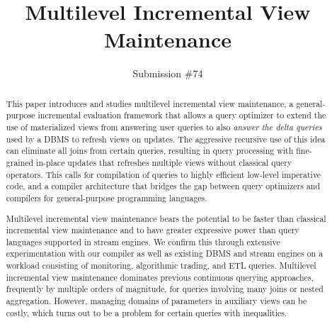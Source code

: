 \documentclass{sig-alternate}
\title{Multilevel Incremental View Maintenance}
\author{
Submission \#74
}
\newcommand{\comment}[1]{}
\begin{document}
\maketitle


\begin{abstract}
This paper introduces and studies multilevel incremental view maintenance,
a general-purpose incremental
evaluation framework that allows a query optimizer to extend the use of
materialized views from answering user queries to also \textit{answer the delta
queries} used by a DBMS to refresh views on updates.
The aggressive recursive use of this idea can eliminate all joins from certain
queries, resulting in query processing with fine-grained in-place updates that
refreshes multiple views without classical query operators. This calls for
compilation of queries to highly efficient low-level imperative code, and a
compiler architecture that bridges the gap between query optimizers and
compilers for general-purpose programming languages.


\comment{
Multilevel incremental view maintenance generalizes the idea of using
materialized views for query answering by allowing a query optimizer to use
materialized views for also answering delta queries, which are the auxiliary
queries that are used in incremental view maintenance to refresh materialized
views when updates happen. Aggressive recursive use of this idea allows to
eliminate all joins from certain queries and to generate highly efficient
low-level code without classical query operators that performs all query
evaluation and view refreshment work. This calls for the compilation of queries.

In this paper, we present a general compiler architecture for languages such as
SQL. To realize such a compiler, we overcome the challenges of materializing
views with binding patterns (parameters) to support arbitrarily nested queries
with aggregates, complex patterns of side effects that may arise, and the need
to perform sophisticated forms of deforestation and fusion frequently employed
in compilers but almost unknown in the database literature.
}

Multilevel incremental view maintenance bears the potential to be
faster than classical incremental view
maintenance and to have greater expressive power than query
languages supported in stream engines.
%
We confirm this through extensive experimentation with
our compiler as well as existing DBMS and stream engines
on a workload consisting of monitoring, algorithmic trading, and ETL
queries. Multilevel incremental view maintenance dominates
previous continuous querying approaches, frequently by multiple orders of
magnitude, for queries involving many joins or nested aggregation. However,
managing domains of parameters in auxiliary views can be costly, which turns out
to be a problem for certain queries with inequalities.
\end{abstract}
\end{document}
